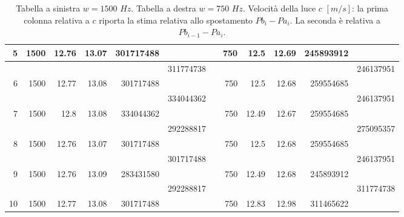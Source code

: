 \begin{table}[htbp]
\begin{center}
\begin{tabular}{|c|c|c|c|c|c|c|c|c|c|c|c|}
\multicolumn{1}{|r|}{5} & \multicolumn{1}{r|}{1500} & \multicolumn{1}{r|}{12.76} & \multicolumn{1}{r|}{13.07} & \multicolumn{1}{r|}{301717488} &  &  & \multicolumn{1}{r|}{750} & \multicolumn{1}{r|}{12.5} & \multicolumn{1}{r|}{12.69} & \multicolumn{1}{r|}{245893912} &  \\ \hline
 &  &  &  &  & \multicolumn{1}{r|}{311774738} &  &  &  &  &  & \multicolumn{1}{r|}{246137951} \\ \hline
\multicolumn{1}{|r|}{6} & \multicolumn{1}{r|}{1500} & \multicolumn{1}{r|}{12.77} & \multicolumn{1}{r|}{13.08} & \multicolumn{1}{r|}{301717488} &  &  & \multicolumn{1}{r|}{750} & \multicolumn{1}{r|}{12.5} & \multicolumn{1}{r|}{12.68} & \multicolumn{1}{r|}{259554685} &  \\ \hline
 &  &  &  &  & \multicolumn{1}{r|}{334044362} &  &  &  &  &  & \multicolumn{1}{r|}{246137951} \\ \hline
\multicolumn{1}{|r|}{7} & \multicolumn{1}{r|}{1500} & \multicolumn{1}{r|}{12.8} & \multicolumn{1}{r|}{13.08} & \multicolumn{1}{r|}{334044362} &  &  & \multicolumn{1}{r|}{750} & \multicolumn{1}{r|}{12.49} & \multicolumn{1}{r|}{12.67} & \multicolumn{1}{r|}{259554685} &  \\ \hline
 &  &  &  &  & \multicolumn{1}{r|}{292288817} &  &  &  &  &  & \multicolumn{1}{r|}{275095357} \\ \hline
\multicolumn{1}{|r|}{8} & \multicolumn{1}{r|}{1500} & \multicolumn{1}{r|}{12.76} & \multicolumn{1}{r|}{13.07} & \multicolumn{1}{r|}{301717488} &  &  & \multicolumn{1}{r|}{750} & \multicolumn{1}{r|}{12.5} & \multicolumn{1}{r|}{12.68} & \multicolumn{1}{r|}{259554685} &  \\ \hline
 &  &  &  &  & \multicolumn{1}{r|}{301717488} &  &  &  &  &  & \multicolumn{1}{r|}{246137951} \\ \hline
\multicolumn{1}{|r|}{9} & \multicolumn{1}{r|}{1500} & \multicolumn{1}{r|}{12.76} & \multicolumn{1}{r|}{13.09} & \multicolumn{1}{r|}{283431580} &  &  & \multicolumn{1}{r|}{750} & \multicolumn{1}{r|}{12.49} & \multicolumn{1}{r|}{12.68} & \multicolumn{1}{r|}{245893912} &  \\ \hline
 &  &  &  &  & \multicolumn{1}{r|}{292288817} &  &  &  &  &  & \multicolumn{1}{r|}{311774738} \\ \hline
\multicolumn{1}{|r|}{10} & \multicolumn{1}{r|}{1500} & \multicolumn{1}{r|}{12.77} & \multicolumn{1}{r|}{13.08} & \multicolumn{1}{r|}{301717488} &  &  & \multicolumn{1}{r|}{750} & \multicolumn{1}{r|}{12.83} & \multicolumn{1}{r|}{12.98} & \multicolumn{1}{r|}{311465622} &  \\ \hline
\end{tabular}
\end{center}
\caption{Tabella a sinistra $ w=1500 $ $Hz$. Tabella a destra $ w=750 $ $Hz$. Velocità della luce $c$ $[m/s]$: la prima colonna relativa a $c$ riporta la stima relativa allo spostamento $Pb_{i}-Pa_{i}$. La seconda è relativa a $ Pb_{i-1} - Pa_{i} $.}
\label{O1_P2}
\end{table}
